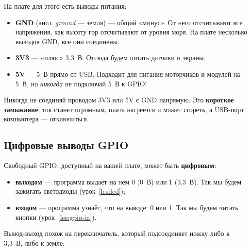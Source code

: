 На плате для этого есть выводы питания:
\begin{itemize}
  \item \textbf{GND} (англ. \emph{ground} --- земля) --- общий «минус». От него отсчитывают все напряжения,
        как высоту гор отсчитывают от уровня моря. На плате несколько выводов GND, все они соединены.
  \item \textbf{3V3} --- «плюс» 3,3~В. Отсюда будем питать датчики и экраны.
  \item \textbf{5V} --- 5~В прямо от USB. Подходит для питания моторчиков и модулей на 5~В, но
        \emph{никогда} не подключай 5~В к GPIO!
\end{itemize}

\begin{caution}
Никогда не соединяй проводом 3V3 или 5V с GND напрямую. Это \textbf{короткое замыкание}: ток станет
огромным, плата нагреется и может сгореть, а USB-порт компьютера --- отключиться.
\end{caution}

\subsection*{Цифровые выводы GPIO}

Свободный GPIO, доступный на вашей плате, может быть \textbf{цифровым}:
\begin{itemize}
  \item \textbf{выходом} --- программа выдаёт на нём 0 (0~В) или 1 (3,3~В). Так мы будем зажигать
        светодиоды (урок~\ref{les:led});
  \item \textbf{входом} --- программа узнаёт, что на выводе: 0 или 1. Так мы будем читать кнопки
        (урок~\ref{les:gpio-in}).
\end{itemize}

Вывод-выход похож на переключатель, который подсоединяет ножку либо к 3,3~В, либо к земле:


